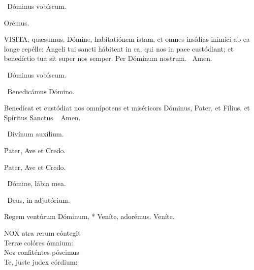 \V\ Dóminus vobíscum.

Orémus. 

\lettrine[lines=2]{V}{ISITA}, quæsumus, Dómine, habitatiónem istam, et omnes insídias inimíci ab ea longe repélle: Angeli tui sancti hábitent in ea, qui nos in pace custódiant; et benedíctio tua sit super nos semper. Per Dóminum nostrum. \R\ Amen.

\V\ Dóminus vobíscum.

\V\ Benedicámus Dómino.

 Benedícat et custódiat nos omnípotens et miséricors Dóminus, Pater, et Fílius, et Spíritus Sanctus. \R\ Amen.


\V\ Divínum auxílium.

Pater, Ave et Credo.



Pater, Ave et Credo.

\V\ Dómine, lábia mea.

\V\ Deus, in adjutórium.


 Regem ventúrum Dóminum, * Veníte, adorémus.  Veníte.


\lettrine[lines=2]{N}{OX} atra rerum cóntegit\\
Terræ colóres ómnium:\\
Nos confiténtes póscimus\\
Te, juste judex córdium:

